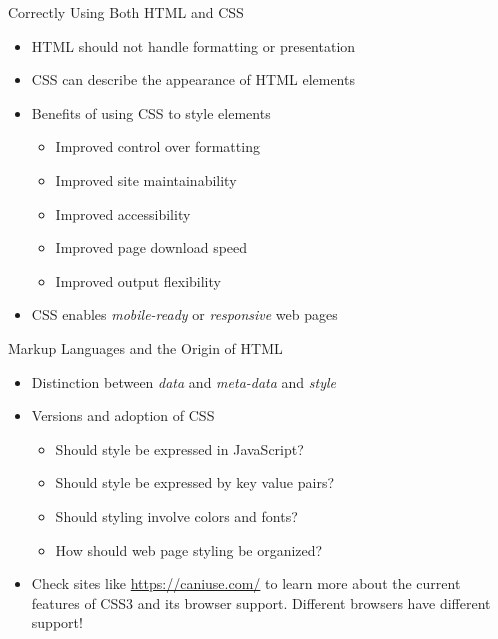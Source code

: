 \documentclass[14pt,aspectratio=169]{beamer}
\begin{document}
%
\begin{frame}{Correctly Using Both HTML and CSS}
%
  \begin{itemize}
    \item HTML should not handle formatting or presentation
      \vspace*{-.2in}
    \item CSS can describe the appearance of HTML elements
      \vspace*{-.15in}
    \item Benefits of using CSS to style elements
      \begin{itemize}
        \item Improved control over formatting
        \item Improved site maintainability
        \item Improved accessibility
        \item Improved page download speed
        \item Improved output flexibility
      \end{itemize}
      \vspace*{-.2in}
    \item CSS enables {\em mobile-ready} or {\em responsive} web pages
  \end{itemize}
%
\end{frame}

%
\begin{frame}{Markup Languages and the Origin of HTML}
%
  \begin{itemize}
    \item Distinction between {\em data} and {\em meta-data} and {\em style}
      \vspace*{-.1in}
    \item Versions and adoption of CSS
      \begin{itemize}
        \item Should style be expressed in JavaScript?
        \item Should style be expressed by key value pairs?
        \item Should styling involve colors and fonts?
        \item How should web page styling be organized?
      \end{itemize}
      \vspace*{-.2in}
    \item Check sites like \url{https://caniuse.com/} to learn more about the
      current features of CSS3 and its browser support. Different browsers have
      different support!
  \end{itemize}
%
\end{frame}
\end{document}
